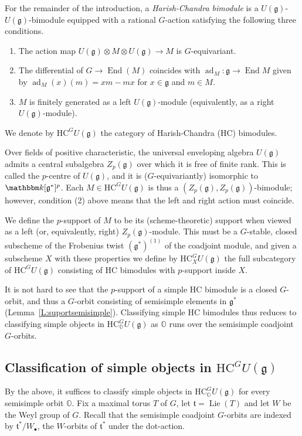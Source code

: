 \documentclass[twoside,12pt,reqno]{amsart}
\theoremstyle{remark}
\numberwithin{equation}{section}
\def\k{{\mathbbm k}}
\def\Lie{\operatorname{Lie}}
\def\ad{\operatorname{ad}}
\def\End{\operatorname{End}}
\def\O{{\mathbb O}}
\def\HC{\mathrm{HC}}
\def\g{{\mathfrak g}}
\def\t{\mathfrak t}
\begin{document}
 For the remainder of the introduction, a {\it Harish-Chandra bimodule} is a $U(\g)$-$U(\g)$-bimodule equipped with a rational $G$-action satisfying the following three conditions.
\begin{enumerate}
    \item[(HC1)] The action map $U(\g) \otimes M \otimes U(\g) \to M$ is $G$-equivariant.
    \item[(HC2)] The differential of $G \to \End(M)$ coincides with $\ad_M : \g\to \End M$ given by $\ad_M(x)(m) = xm - mx$ for $x\in \g$ and $m\in M$.
    \item[(HC3)] $M$ is finitely generated as a left $U(\g)$-module (equivalently, as a right $U(\g)$-module).
\end{enumerate}
We denote by $\HC^G U(\g)$ the category of Harish-Chandra (HC) bimodules.

Over fields of positive characteristic, the universal enveloping algebra $U(\g)$ admits a central subalgebra $Z_p(\g)$ over which it is free of finite rank. This is called the $p$-centre of $U(\g)$, and it is ($G$-equivariantly) isomorphic to $\k[\g^*]^p$. Each $M\in\HC^G U(\g)$ is thus a $(Z_p(\g),Z_p(\g))$-bimodule; however, condition (2) above means that the left and right action must coincide.

We define the $p$-support of $M$ to be its (scheme-theoretic) support when viewed as a left (or, equivalently, right) $Z_p(\g)$-module. This must be a $G$-stable, closed subscheme of the Frobenius twist $(\g^*)^{(1)}$ of the coadjoint module, and given a subscheme $X$ with these properties we define by $\HC^G_X U(\g)$ the full subcategory of $\HC^G U(\g)$ consisting of HC bimodules with $p$-support inside $X$.

It is not hard to see that the $p$-support of a simple HC bimodule is a closed $G$-orbit, and thus a $G$-orbit consisting of semisimple elements in $\g^*$ (Lemma~\ref{L:suportsemisimple}). Classifying simple HC bimodules thus reduces to classifying simple objects in $\HC^G_\O U(\g)$ as $\O$ runs over the semisimple coadjoint $G$-orbits.


\subsection{Classification of simple objects in $\HC^G U(\g)$}
\label{ss:sketchclassificationintro}

By the above, 
it suffices to classify simple objects in 
$\HC_{\O}^G U(\g)$ for every 
semisimple orbit $\O$. Fix a maximal torus $T$ of $G$, let $\t=\Lie(T)$ and let $W$ be the Weyl group of $G$. Recall that the semisimple coadjoint $G$-orbits are indexed by $\t^*/W_\bullet$, the $W$-orbits of $\t^*$ under the dot-action.
\end{document}
